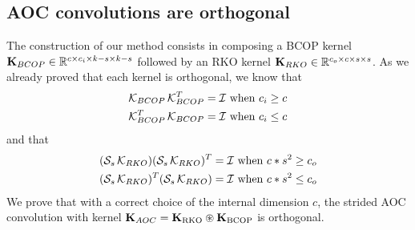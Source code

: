 
    \subsection{AOC convolutions are orthogonal}
\label{sec:ap_proof_aoc_ortho}
        The construction of our method consists in composing a BCOP kernel $ \mathbf{K}_{BCOP} \in \mathbb{R}^{c \times c_i \times k-s \times k-s} $ followed by an RKO kernel $ \mathbf{K}_{RKO} \in \mathbb{R}^{c_o \times c \times s \times s} $. As we already proved that each kernel is orthogonal, we know that 
        \begin{align*}
            \mathcal{K}_{BCOP} \, \mathcal{K}_{BCOP}^T = \mathcal{I} \text{ when } c_i \geq c \\
            \mathcal{K}_{BCOP}^T \, \mathcal{K}_{BCOP} = \mathcal{I} \text{ when } c_i \leq c
        \end{align*}
        and that 
        \begin{align*}
            (\mathcal{S}_{s} \, \mathcal{K}_{RKO})(\mathcal{S}_{s} \, \mathcal{K}_{RKO})^T = \mathcal{I} \text{ when } c*s^2 \geq c_o \\
            (\mathcal{S}_{s} \, \mathcal{K}_{RKO})^T(\mathcal{S}_{s} \, \mathcal{K}_{RKO}) = \mathcal{I} \text{ when } c*s^2 \leq c_o
        \end{align*}
    We prove that with a correct choice of the internal dimension $c$, the strided AOC convolution with kernel $\mathbf{K}_{AOC}= \mathbf{K}_{\text{RKO}} \circledast \mathbf{K}_{\text{BCOP}}$ is orthogonal.
    
